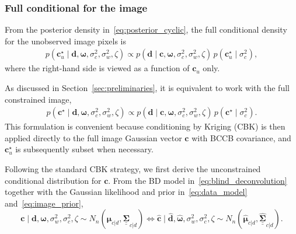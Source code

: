 \documentclass[12pt]{article}
\newcommand{\mybcirc}[1] {\underline{\underline{\bm{#1}}}}
\begin{document}
\subsubsection{Full conditional for the image}\label{sec:fc_refl}

From the posterior density in~\eqref{eq:posterior_cyclic}, the full conditional density for the unobserved image pixels is
\begin{align}
\label{eq:FC_reflectivity_constrained_u}
p(\bm{c}_u^{\star}\mid \bm{d}, \bm{\omega}, \sigma_c^2, \sigma_w^2, \zeta)
\propto
p(\bm{d}\mid \bm{c}, \bm{\omega}, \sigma_c^2, \sigma_w^2, \zeta)
\, p(\bm{c}_u^{\star}\mid \sigma_c^2),
\end{align}
where the right-hand side is viewed as a function of $\bm c_u$ only.

As discussed in Section~\ref{sec:preliminaries}, it is equivalent to work with the full constrained image,
\begin{align}
\label{eq:FC_reflectivity_constrained}
p(\bm{c}^{\star}\mid \bm{d}, \bm{\omega}, \sigma_c^2, \sigma_w^2, \zeta)
\propto
p(\bm{d}\mid \bm{c}, \bm{\omega}, \sigma_c^2, \sigma_w^2, \zeta)
\, p(\bm{c}^{\star}\mid \sigma_c^2).
\end{align}
This formulation is convenient because conditioning by Kriging (CBK) is then applied directly to the full image Gaussian vector $\bm{c}$ with BCCB covariance, and $\bm c_u^{\star}$ is subsequently subset when necessary. 

Following the standard CBK strategy, we first derive the unconstrained conditional distribution for $\bm{c}$. From the BD model in~\eqref{eq:blind_deconvolution} together with the Gaussian likelihood and prior in~\eqref{eq:data_model} and~\eqref{eq:image_prior},
\begin{equation}
\label{eq:fc_image_unconstrained}
\bm{c}\mid\bm{d}, \bm{\omega}, \sigma_w^2, \sigma_c^2, \zeta
\sim
N_n(\bm{\mu}_{c|d}, \mybcirc{\Sigma}_{c|d})
\iff
\hat{\bm{c}}\mid\hat{\bm{d}}, \hat{\bm{\omega}}, \sigma_w^2, \sigma_c^2, \zeta
\sim
N_n(\hat{\bm{\mu}}_{c|d}, \hat{\mybcirc{\Sigma}}_{c|d}).
\end{equation}
\end{document}
